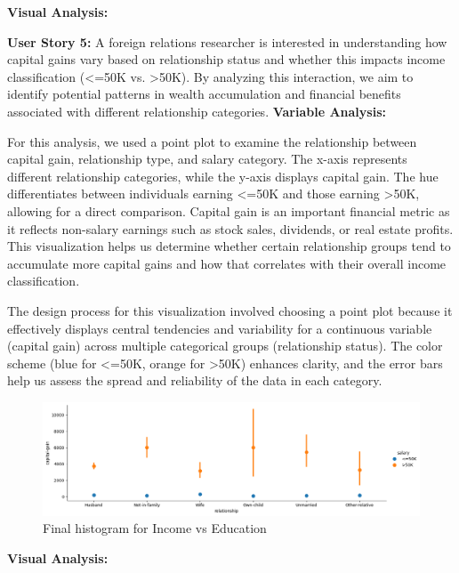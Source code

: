 \documentclass[journal,onecolumn]{IEEEtran}
\begin{document}
\textbf{Visual Analysis:} 


\textbf{User Story 5:} A foreign relations researcher is interested in
understanding how capital gains vary based on relationship status
and whether this impacts income classification (<=50K vs. >50K).
By analyzing this interaction, we aim to identify potential patterns
in wealth accumulation and financial benefits associated with different
relationship categories.
\textbf{Variable Analysis:} 

For this analysis, we used a point plot to examine the relationship between
capital gain, relationship type, and salary category. The x-axis represents
different relationship categories, while the y-axis displays capital gain.
The hue differentiates between individuals earning <=50K and those earning
>50K, allowing for a direct comparison. Capital gain is an important
financial metric as it reflects non-salary earnings such as stock sales,
dividends, or real estate profits. This visualization helps us determine
whether certain relationship groups tend to accumulate more capital gains
and how that correlates with their overall income classification.

The design process for this visualization involved choosing a point plot
because it effectively displays central tendencies and variability for
a continuous variable (capital gain) across multiple categorical groups
(relationship status). The color scheme (blue for <=50K, orange for >50K)
enhances clarity, and the error bars help us assess the spread and
reliability of the data in each category.

\begin{figure}[h]
    \centering
    \includegraphics[width=0.9\linewidth]{capital-gain-relationship.png}  %
    \caption{Final histogram for Income vs Education}
    \label{fig:final_income_vs_education}
\end{figure}


\textbf{Visual Analysis:} 
\end{document}
